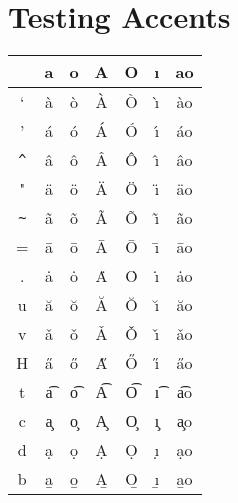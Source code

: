 \documentclass{article}
\begin{document}
\section{Testing Accents}
\begin{tabular}{c|cccccc}
         &    a  &    o  &    A  &    O  &    \i  &    ao \\\hline
`        & \`{a} & \`{o} & \`{A} & \`{O} & \`{\i} & \`{ao} \\
'        & \'{a} & \'{o} & \'{A} & \'{O} & \'{\i} & \'{ao} \\
\verb|^| & \^{a} & \^{o} & \^{A} & \^{O} & \^{\i} & \^{ao} \\
"        & \"{a} & \"{o} & \"{A} & \"{O} & \"{\i} & \"{ao} \\
\verb|~| & \~{a} & \~{o} & \~{A} & \~{O} & \~{\i} & \~{ao} \\
=        & \={a} & \={o} & \={A} & \={O} & \={\i} & \={ao} \\
.        & \.{a} & \.{o} & \.{A} & \.{O} & \.{\i} & \.{ao} \\
u        & \u{a} & \u{o} & \u{A} & \u{O} & \u{\i} & \u{ao} \\
v        & \v{a} & \v{o} & \v{A} & \v{O} & \v{\i} & \v{ao} \\
H        & \H{a} & \H{o} & \H{A} & \H{O} & \H{\i} & \H{ao} \\
t        & \t{a} & \t{o} & \t{A} & \t{O} & \t{\i} & \t{ao} \\
c        & \c{a} & \c{o} & \c{A} & \c{O} & \c{\i} & \c{ao} \\
d        & \d{a} & \d{o} & \d{A} & \d{O} & \d{\i} & \d{ao} \\
b        & \b{a} & \b{o} & \b{A} & \b{O} & \b{\i} & \b{ao} \\
\end{tabular}
\end{document}
